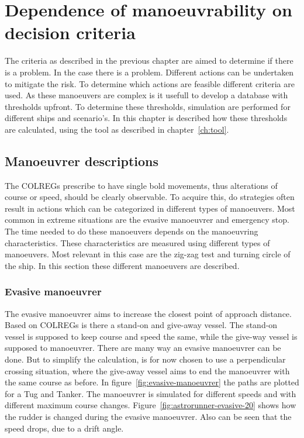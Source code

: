 \chapter{Dependence of manoeuvrability on decision criteria}
\label{ch:criteria-manouvre}
The criteria as described in the previous chapter are aimed to determine if there is a problem. In the case there is a problem. Different actions can be undertaken to mitigate the risk. To determine which actions are feasible different criteria are used. As these manoeuvers are complex is it usefull to develop a database with thresholds upfront. To determine these thresholds, simulation are performed for different ships and scenario's. In this chapter is described how these thresholds are calculated, using the tool as described in chapter~\ref{ch:tool}. 

\section{Manoeuvrer descriptions}
The \ac{COLREGs} prescribe to have single bold movements, thus alterations of course or speed, should be clearly observable. To acquire this, do strategies often result in actions which can be categorized in different types of manoeuvers. Most common in extreme situations are the evasive manoeuvrer and emergency stop. The time needed to do these manoeuvers depends on the manoeuvring characteristics. These characteristics are measured using different types of manoeuvers. Most relevant in this case are the zig-zag test and turning circle of the ship. In this section these different manoeuvers are described.

\subsection{Evasive manoeuvrer}
The evasive manoeuvrer aims to increase the closest point of approach distance. Based on \ac{COLREGs} is there a stand-on and give-away vessel. The stand-on vessel is supposed to keep course and speed the same, while the give-way vessel is supposed to manoeuvrer. 
There are many way an evasive manoeuvrer can be done. But to simplify the calculation, is for now chosen to use a perpendicular crossing situation, where the give-away vessel aims to end the manoeuvrer with the same course as before. In figure~\ref{fig:evasive-manoeuvrer} the paths are plotted for a Tug and Tanker. The manoeuvrer is simulated for different speeds and with different maximum course changes. 
Figure~\ref{fig:astrorunner-evasive-20} shows how the rudder is changed during the evasive manoeuvrer. Also can be seen that the speed drops, due to a drift angle.

